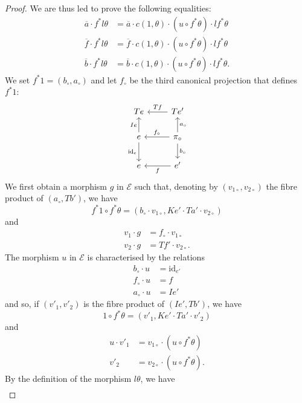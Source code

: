 \documentclass[fleqn]{article}
\newcommand{\id}{\mathrm{id}}
\newcommand{\cat}[1]{\mathcal{#1}}
\begin{document}
\begin{proof}
  We are thus led to prove the following equalities:
  \begin{align}
    \overline{a}\cdot f^*l\theta
    &= \overline{a}\cdot c(1,\theta)\cdot (u\circ f^*\theta)\cdot lf^*\theta
    \tag{1}
  \\\overline{f}\cdot f^*l\theta
    &= \overline{f}\cdot c(1,\theta)\cdot (u\circ f^*\theta)\cdot lf^*\theta
    \tag{2}
  \\\overline{b}\cdot f^*l\theta
    &= \overline{b}\cdot c(1,\theta)\cdot (u\circ f^*\theta)\cdot lf^*\theta.
    \tag{3}
  \end{align}
  We set $f^*1=(b_\circ,a_\circ)$ and let $f_\circ$ be the third canonical projection that defines $f^*1$:
  \[
    \begin{tikzcd}
      Te
    & Te'
        \ar[l,swap,"Tf"]
    \\e
        \ar[u,"Ie"]
        \ar[d,swap,"\id_e"]
    & \pi_\circ
        \ar[u,swap,"a_\circ"]
        \ar[d,"b_\circ"]
        \ar[l,swap,"f_\circ"]
    \\e
    & e'
        \ar[l,"f"]
    \end{tikzcd}
  \]
  We first obtain a morphism $g$ in $\cat{E}$ such that, denoting by $(v_{1\circ},v_{2\circ})$ the fibre product of $(a_\circ,Tb')$, we have
  \[
    f^*1\circ f^*\theta
    = (b_\circ\cdot v_{1\circ}, Ke'\cdot Ta'\cdot v_{2\circ})
  \]
  and
  \[
    \begin{aligned}
      v_1\cdot g
      &= f_\circ\cdot v_{1\circ}
    \\v_2\cdot g
      &= Tf'\cdot v_{2\circ}.
    \end{aligned}
    \tag{4}
  \]
  The morphism $u$ in $\cat{E}$ is characterised by the relations
  \[
    \begin{aligned}
      b_\circ\cdot u
      &= \id_{e'}
    \\f_\circ\cdot u
      &= f
    \\a_\circ\cdot u
      &= Ie'
    \end{aligned}
    \tag{5}
  \]
  and so, if $(v'_1,v'_2)$ is the fibre product of $(Ie',Tb')$, we have
  \[
    1\circ f^*\theta
    = (v'_1, Ke'\cdot Ta'\cdot v'_2)
  \]
  and
  \[
    \begin{aligned}
      u\cdot v'_1
      &= v_{1\circ}\cdot(u\circ f^*\theta)
    \\v'_2
      &= v_{2\circ}\cdot(u\circ f^*\theta).
    \end{aligned}
    \tag{6}
  \]
  By the definition of the morphism $l\theta$, we have
  \[
    \begin{aligned}

\end{aligned}\]
\end{proof}
\end{document}
